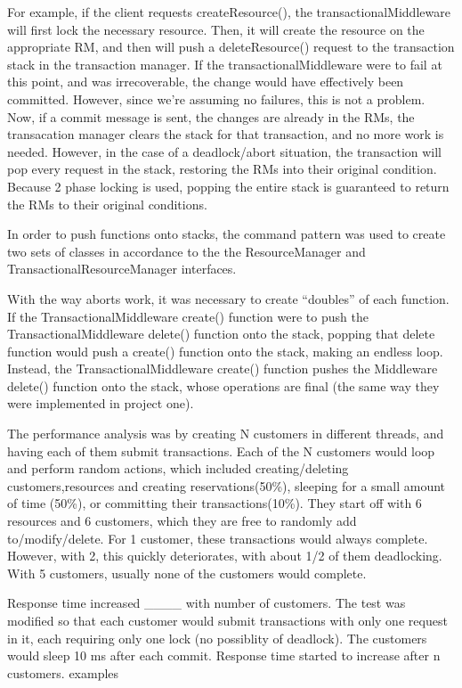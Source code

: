 \documentclass[letterpaper,12pt]{article}
\begin{document}
For example, if the client requests createResource(), the transactionalMiddleware will first lock the necessary resource. Then, it will create the resource on the appropriate RM, and then will push a deleteResource() request to the transaction stack in the transaction manager. If the transactionalMiddleware were to fail at this point, and was irrecoverable, the change would have effectively been committed. However, since we're assuming no failures, this is not a problem. Now, if a commit message is sent, the changes are already in the RMs, the transacation manager clears the stack for that transaction, and no more work is needed. However, in the case of a deadlock/abort situation, the transaction will pop every request in the stack, restoring the RMs into their original condition. Because 2 phase locking is used, popping the entire stack is guaranteed to return the RMs to their original conditions.

In order to push functions onto stacks, the command pattern was used to create two sets of classes in accordance to the the ResourceManager and TransactionalResourceManager interfaces.

With the way aborts work, it was necessary to create ``doubles'' of each function. If the TransactionalMiddleware create() function were to push the TransactionalMiddleware delete() function onto the stack, popping that delete function would push a create() function onto the stack, making an endless loop. Instead, the TransactionalMiddleware create() function pushes the Middleware delete() function onto the stack, whose operations are final (the same way they were implemented in project one).

The performance analysis was by creating N customers in different threads, and having each of them submit transactions. Each of the N customers would loop and perform random actions, which included creating/deleting customers,resources and creating reservations(50\%), sleeping for a small amount of time (50\%), or committing their transactions(10\%). They start off with 6 resources and 6 customers, which they are free to randomly add to/modify/delete.
For 1 customer, these transactions would always complete. However, with 2, this quickly deteriorates, with about 1/2 of them deadlocking. With 5 customers, usually none of the customers would complete.

Response time increased ____ with number of customers. The test was modified so that each customer would submit transactions with only one request in it, each requiring only one lock (no possiblity of deadlock). The customers would sleep 10 ms after each commit. Response time started to increase after n customers.
examples
\end{document}
